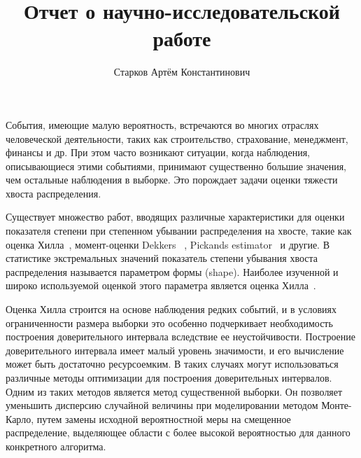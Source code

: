 \documentclass[12pt, specialist, subf, substylefile = spbu.rtx]{disser}
\begin{document}



\title{Отчет о научно-исследовательской работе}
\author{Старков Артём Константинович}




\date{\number\year}

\maketitle

\tableofcontents


\intro

События, имеющие малую вероятность, встречаются во многих отраслях человеческой деятельности, таких как строительство, страхование, менеджмент, финансы и др. При этом часто возникают ситуации, когда наблюдения, описывающиеся этими событиями, принимают существенно большие значения, чем остальные наблюдения в выборке. Это порождает задачи оценки тяжести хвоста распределения.

Существует множество работ, вводящих различные характеристики для оценки показателя степени при степенном убывании распределения на хвосте, такие как оценка Хилла~\cite{Hill}, момент-оценки Dekkers ~\cite{dekkers1989}, Pickands estimator~\cite{iii1975} и другие. В статистике экстремальных значений показатель степени убывания хвоста распределения называется параметром формы (shape). Наиболее изученной и широко используемой оценкой этого параметра является оценка Хилла~\cite{Hill}.

Оценка Хилла строится на основе наблюдения редких событий, и в условиях ограниченности размера выборки это особенно подчеркивает необходимость построения доверительного интервала вследствие ее неустойчивости. Построение доверительного интервала имеет малый уровень значимости, и его вычисление может быть достаточно ресурсоемким. В таких случаях могут использоваться различные методы оптимизации для построения доверительных интервалов. Одним из таких методов является метод существенной выборки. Он позволяет уменьшить дисперсию случайной величины при моделировании методом Монте-Карло, путем замены исходной вероятностной меры на смещенное распределение, выделяющее области с более высокой вероятностью для данного конкретного алгоритма.
\end{document}
